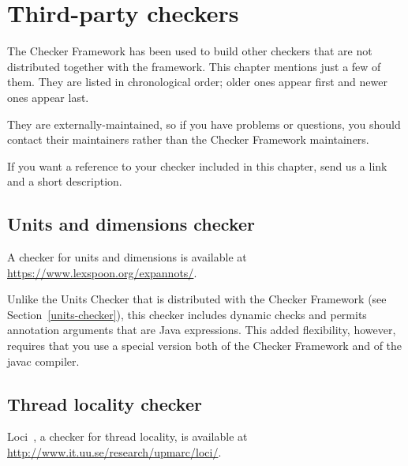 \htmlhr
\chapter{Third-party checkers\label{third-party-checkers}\label{external-checkers}}

The Checker Framework has been used to build other checkers that are not
distributed together with the framework.  This chapter mentions just a few
of them.  They are listed in chronological order; older ones appear first
and newer ones appear last.

They are externally-maintained, so if you have problems or questions, you
should contact their maintainers rather than the Checker Framework
maintainers.

If you want a reference to your checker included in this chapter,
send us a link and a short description.







\section{Units and dimensions checker\label{units-and-dimensions-checker}}

A checker for units and dimensions is available at
\url{https://www.lexspoon.org/expannots/}.

Unlike the Units Checker that is distributed with the Checker Framework
(see Section~\ref{units-checker}), this checker includes dynamic checks and
permits annotation arguments that are Java expressions.  This added
flexibility, however, requires that you use a special version both of the
Checker Framework and of the javac compiler.


\section{Thread locality checker\label{loci-thread-locality-checker}}

Loci~\cite{WrigstadPMZV2009}, a checker for thread locality, is available at
\url{http://www.it.uu.se/research/upmarc/loci/}.




